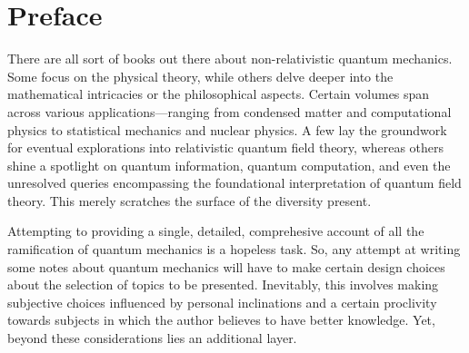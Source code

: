 \chapter*{Preface}

\smallskip

There are all sort of books out there about non-relativistic quantum mechanics. 
 Some focus on the physical theory, while others delve deeper into the mathematical intricacies or the philosophical aspects. 
 Certain volumes span across various applications—ranging from condensed matter and computational physics to statistical mechanics and nuclear physics. 
 A few lay the groundwork for eventual explorations into relativistic quantum field theory, whereas others shine a spotlight on quantum information, quantum computation, and even the unresolved queries encompassing the foundational interpretation of quantum field theory. This merely scratches the surface of the diversity present.

Attempting to providing a single, detailed, comprehesive account of all the ramification of quantum mechanics is a hopeless task. 
So, any attempt at writing some notes about quantum mechanics will have to make certain design choices about the selection of topics to be presented. 
Inevitably, this involves making subjective choices influenced by personal inclinations and a certain proclivity towards subjects in which the author believes to have better knowledge. 
Yet, beyond these considerations lies an additional layer.

\noindent\textsw{\myLocation, \myTime}


\begin{flushright}
        \myName
\end{flushright}

